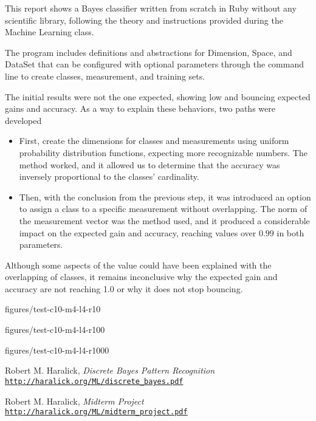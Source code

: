 \documentclass[letterpaper, conference]{IEEEtran}
\begin{document}
This report shows a Bayes classifier written from scratch in Ruby without any scientific library, following the theory and instructions provided during the Machine Learning class.

The program includes definitions and abstractions for Dimension, Space, and DataSet that can be configured with optional parameters through the command line to create classes, measurement, and training sets.

The initial results were not the one expected, showing low and bouncing expected gains and accuracy. As a way to explain these behaviors, two paths were developed

\begin{itemize}
  \item First, create the dimensions for classes and measurements using uniform probability distribution functions, expecting more recognizable numbers. The method worked, and it allowed us to determine that the accuracy was inversely proportional to the classes' cardinality.
  \item Then, with the conclusion from the previous step, it was introduced an option to assign a class to a specific measurement without overlapping. The norm of the measurement vector was the method used, and it produced a considerable impact on the expected gain and accuracy, reaching values over $0.99$ in both parameters.
\end{itemize}

Although some aspects of the value could have been explained with the overlapping of classes, it remains inconclusive why the expected gain and accuracy are not reaching 1.0 or why it does not stop bouncing.

figures/test-c10-m4-l4-r10


figures/test-c10-m4-l4-r100


figures/test-c10-m4-l4-r1000



\begin{thebibliography}{2}

Robert M. Haralick,
\textit{Discrete Bayes Pattern Recognition}
\\\texttt{\url{http://haralick.org/ML/discrete_bayes.pdf}}

Robert M. Haralick,
\textit{Midterm Project}
\\\texttt{\url{http://haralick.org/ML/midterm_project.pdf}}

\end{thebibliography}
\end{document}
